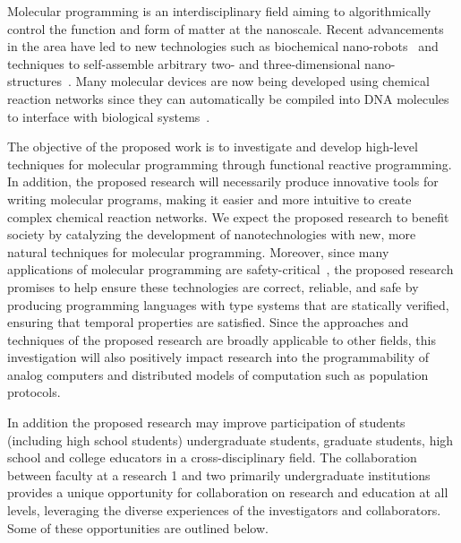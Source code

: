 

Molecular programming is an interdisciplinary field aiming to algorithmically control the function and form of matter at the nanoscale.
Recent advancements in the area have led to new technologies such as biochemical nano-robots~\cite{jDoBaCh12} and techniques to self-assemble arbitrary two- and three-dimensional nano-structures~\cite{jRoth06,jDDLHGS09,jDMTVCS09,jKOSY12,benson2015dna,Juneaav0655}.
Many molecular devices are now being developed using chemical reaction networks since they can automatically be compiled into DNA molecules to interface with biological systems~\cite{cSoSeWi09,jLYCP12,jCard13,jCDSPCS13,jSPSWS17,cBSJDTW17}.

The objective of the proposed work is to investigate and develop high-level techniques for molecular programming through functional reactive programming.
In addition, the proposed research will necessarily produce innovative tools for writing molecular programs, making it easier and more intuitive to create complex chemical reaction networks.
We expect the proposed research to benefit society by catalyzing the development of nanotechnologies with new, more natural techniques for molecular programming.
Moreover, since many applications of molecular programming are safety-critical~\cite{jEKLLLM17,cLutz18}, the proposed research promises to help ensure these technologies are correct, reliable, and safe by producing programming languages with type systems that are statically verified, ensuring that temporal properties are satisfied.
Since the approaches and techniques of the proposed research are broadly applicable to other fields, this investigation will also positively impact research into the programmability of analog computers and distributed models of computation such as population protocols.

In addition the proposed research may improve participation of students (including high school students) undergraduate students, graduate students, high school and college educators in a cross-disciplinary field.
The collaboration between faculty at a research 1 and two primarily undergraduate institutions provides a unique opportunity for collaboration on research and education at all levels, leveraging the diverse experiences of the investigators and collaborators.
Some of these opportunities are outlined below.  

